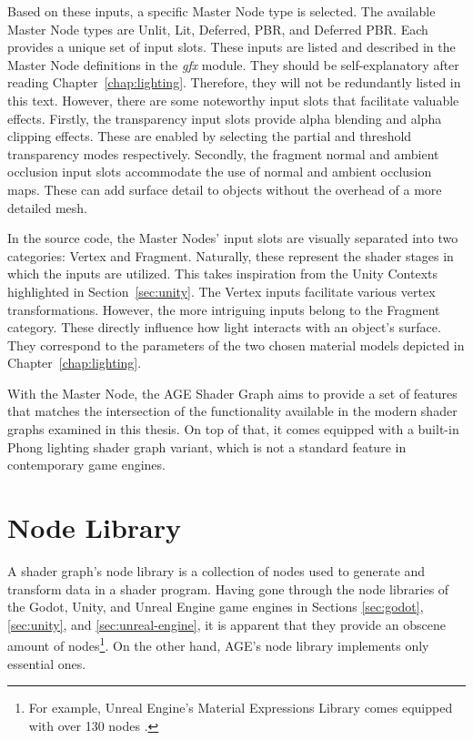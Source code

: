 \documentclass[
  digital,     %
  oneside,     %
  nosansbold,  %
  nocolorbold, %
  lof,         %
  lot,         %
]{fithesis4}
\begin{document}
Based on these inputs, a specific Master Node type is selected. The available Master Node types are
Unlit, Lit, Deferred, PBR, and Deferred PBR. Each provides a unique set of input slots.
These inputs are listed and described in the Master Node definitions in the \textit{gfx} module.
They should be self-explanatory after reading Chapter~\ref{chap:lighting}.
Therefore, they will not be redundantly listed in this text.
However, there are some noteworthy input slots that facilitate valuable effects.
Firstly, the transparency input slots provide alpha blending and alpha clipping effects.
These are enabled by selecting the partial and threshold transparency modes respectively.
Secondly, the fragment normal and ambient occlusion input slots accommodate the use of normal and ambient occlusion maps.
These can add surface detail to objects without the overhead of a more detailed mesh.

In the source code, the Master Nodes' input slots are visually separated into two categories:
Vertex and Fragment. Naturally, these represent the shader stages in which the inputs are utilized.
This takes inspiration from the Unity Contexts highlighted in Section~\ref{sec:unity}.
The Vertex inputs facilitate various vertex transformations. However, the more intriguing inputs
belong to the Fragment category. These directly influence how light interacts with an object's surface.
They correspond to the parameters of the two chosen material models depicted in Chapter~\ref{chap:lighting}.

With the Master Node, the AGE Shader Graph aims to provide a set of features
that matches the intersection of the functionality available in the modern shader graphs examined in this thesis.
On top of that, it comes equipped with a built-in Phong lighting shader graph variant, which
is not a standard feature in contemporary game engines.

\section{Node Library}
A shader graph's node library is a collection of nodes used to generate and transform
data in a shader program. Having gone through the node libraries of the Godot, Unity, and Unreal Engine game engines
in Sections \ref{sec:godot}, \ref{sec:unity}, and \ref{sec:unreal-engine},
it is apparent that they provide an obscene amount of nodes\footnote{For example, Unreal Engine's Material Expressions Library comes equipped
with over 130 nodes \cite{ue-expr-reference}.}. On the other hand, AGE's node library implements only essential ones.
\end{document}
